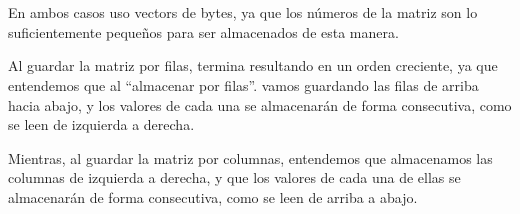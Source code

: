 \documentclass[a4paper]{report}
\begin{document}
\inputminted[linenos, breaklines, breakbytokenanywhere]{mips}{src/problemas/5.asm}


\section{}

\inputminted[linenos]{mips}{src/problemas/6.asm}

En ambos casos uso vectors de bytes, ya que los números de la matriz son lo suficientemente pequeños para ser almacenados de esta manera.

Al guardar la matriz por filas, termina resultando en un orden creciente, ya que entendemos que al ``almacenar por filas''. vamos guardando las filas de arriba hacia abajo, y los valores de cada una se almacenarán de forma consecutiva, como se leen de izquierda a derecha.

Mientras, al guardar la matriz por columnas, entendemos que almacenamos las columnas de izquierda a derecha, y que los valores de cada una de ellas se almacenarán de forma consecutiva, como se leen de arriba a abajo.
\end{document}
